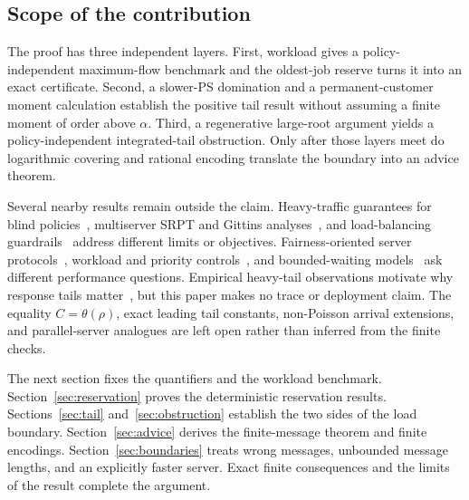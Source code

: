 \subsection{Scope of the contribution}
The proof has three independent layers. First, workload gives a policy-independent maximum-flow benchmark and the oldest-job reserve turns it into an exact certificate. Second, a slower-PS domination and a permanent-customer moment calculation establish the positive tail result without assuming a finite moment of order above $\alpha$. Third, a regenerative large-root argument yields a policy-independent integrated-tail obstruction. Only after those layers meet do logarithmic covering and rational encoding translate the boundary into an advice theorem.

Several nearby results remain outside the claim. Heavy-traffic guarantees for blind policies~\cite{bansal2018}, multiserver SRPT and Gittins analyses~\cite{grosof2018,scully2020gittins,hong2024}, and load-balancing guardrails~\cite{grosof2019} address different limits or objectives. Fairness-oriented server protocols~\cite{friedman2003}, workload and priority controls~\cite{fajardo2015,fajardo2017}, and bounded-waiting models~\cite{gavish1977} ask different performance questions. Empirical heavy-tail observations motivate why response tails matter~\cite{crovella1996,harcholbalter2003}, but this paper makes no trace or deployment claim. The equality $C=\theta(\rho)$, exact leading tail constants, non-Poisson arrival extensions, and parallel-server analogues are left open rather than inferred from the finite checks.

The next section fixes the quantifiers and the workload benchmark. Section~\ref{sec:reservation} proves the deterministic reservation results. Sections~\ref{sec:tail} and~\ref{sec:obstruction} establish the two sides of the load boundary. Section~\ref{sec:advice} derives the finite-message theorem and finite encodings. Section~\ref{sec:boundaries} treats wrong messages, unbounded message lengths, and an explicitly faster server. Exact finite consequences and the limits of the result complete the argument.
